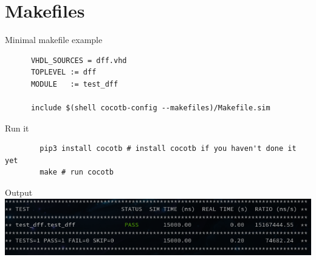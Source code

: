\documentclass[aspectratio=169]{beamer}
\begin{document}


\section*{Makefiles}
\begin{frame}[fragile]{\secname}
  
  \begin{block}{Minimal makefile example}
    \begin{verbatim}
      VHDL_SOURCES = dff.vhd
      TOPLEVEL := dff
      MODULE   := test_dff

      include $(shell cocotb-config --makefiles)/Makefile.sim
    \end{verbatim}

    \begin{block}{Run it}
      \begin{verbatim}
        pip3 install cocotb # install cocotb if you haven't done it yet
        make # run cocotb
      \end{verbatim}
    \end{block}

    \begin{block}{Output}
    \includegraphics[width=1.0\textwidth]{figs/cocotb_dff.png}
    \end{block}
    
    
  \end{block}
    
\end{frame}

\end{document}
